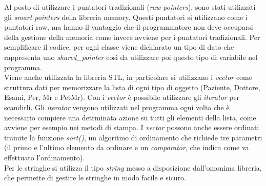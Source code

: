 \documentclass[a4paper,12pt]{article}
\begin{document}
{Al posto di utilizzare i puntatori tradizionali (\textit{raw pointers}), sono stati utilizzati gli \textit{smart pointers} della libreria memory. Questi puntatori si utilizzano come i puntatori raw, ma hanno il vantaggio che il programmatore non deve occuparsi della gestione della memoria come invece avviene per i puntatori tradizionali. Per semplificare il codice, per ogni classe viene dichiarato un tipo di dato che rappresenta uno \textit{shared\_pointer} così da utilizzare poi questo tipo di variabile nel programma. \\
Viene anche utilizzata la libreria STL, in particolare si utilizzano i \textit{vector} come struttura dati per memorizzare la lista di ogni tipo di oggetto (Paziente, Dottore, Esami, Per, Mr e PetMr). Con i \textit{vector} è possibile utilizzare gli \textit{iterator} per scandirli. Gli \textit{iterator} vengono utilizzati nel programma ogni volta che è necessario compiere una detrminata azione su tutti gli elementi della lista, come avviene per esempio nei metodi di stampa. I \textit{vector} possono anche essere ordinati tramite la funzione \textit{sort()}, un algoritmo di ordinamento che richiede tre parametri (il primo e l'ultimo elemento da ordinare e un \textit{comparator}, che indica come va effettuato l'ordinamento). \\
Per le stringhe si utilizza il tipo \textit{string} messo a disposizione dall'omonima libreria, che permette di gestire le stringhe in modo facile e sicuro.







}
\end{document}
